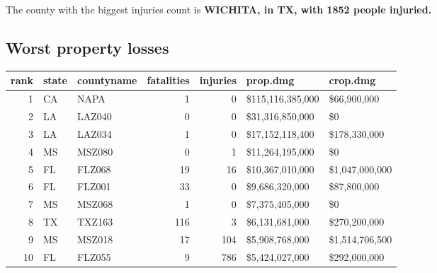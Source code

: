 \documentclass[]{article}
\newenvironment{Shaded}{\begin{snugshade}}{\end{snugshade}}
\newcommand{\KeywordTok}[1]{\textcolor[rgb]{0.13,0.29,0.53}{\textbf{{#1}}}}
\newcommand{\DataTypeTok}[1]{\textcolor[rgb]{0.13,0.29,0.53}{{#1}}}
\newcommand{\DecValTok}[1]{\textcolor[rgb]{0.00,0.00,0.81}{{#1}}}
\newcommand{\StringTok}[1]{\textcolor[rgb]{0.31,0.60,0.02}{{#1}}}
\newcommand{\CommentTok}[1]{\textcolor[rgb]{0.56,0.35,0.01}{\textit{{#1}}}}
\newcommand{\NormalTok}[1]{{#1}}
\begin{document}
The county with the biggest injuries count is \textbf{WICHITA, in TX,
with 1852 people injuried.}

\subsection{Worst property losses}\label{worst-property-losses}

\begin{Shaded}
\end{Shaded}

\begin{longtable}[]{@{}rllrrll@{}}
\toprule
rank & state & countyname & fatalities & injuries & prop.dmg &
crop.dmg\tabularnewline
\midrule
\endhead
1 & CA & NAPA & 1 & 0 & \$115,116,385,000 & \$66,900,000\tabularnewline
2 & LA & LAZ040 & 0 & 0 & \$31,316,850,000 & \$0\tabularnewline
3 & LA & LAZ034 & 1 & 0 & \$17,152,118,400 &
\$178,330,000\tabularnewline
4 & MS & MSZ080 & 0 & 1 & \$11,264,195,000 & \$0\tabularnewline
5 & FL & FLZ068 & 19 & 16 & \$10,367,010,000 &
\$1,047,000,000\tabularnewline
6 & FL & FLZ001 & 33 & 0 & \$9,686,320,000 & \$87,800,000\tabularnewline
7 & MS & MSZ068 & 1 & 0 & \$7,375,405,000 & \$0\tabularnewline
8 & TX & TXZ163 & 116 & 3 & \$6,131,681,000 &
\$270,200,000\tabularnewline
9 & MS & MSZ018 & 17 & 104 & \$5,908,768,000 &
\$1,514,706,500\tabularnewline
10 & FL & FLZ055 & 9 & 786 & \$5,424,027,000 &
\$292,000,000\tabularnewline
\bottomrule
\end{longtable}

\begin{Shaded}
\end{Shaded}
\end{document}
